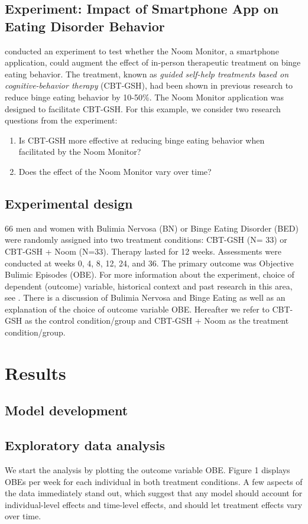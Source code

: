 \documentclass{article}
\begin{document}
\subsection{Experiment: Impact of Smartphone App on Eating Disorder Behavior}
 conducted an experiment to test whether the Noom Monitor, a smartphone application, could augment the effect of in-person therapeutic treatment on binge eating behavior.  The treatment, known as \emph{guided self-help treatments based on cognitive-behavior therapy} (CBT-GSH), had been shown in previous research to reduce binge eating behavior by 10-50\%.  The Noom Monitor application was designed to facilitate CBT-GSH.  For this example, we consider two research questions from the experiment:
\begin{enumerate}
\item{Is CBT-GSH more effective at reducing binge eating behavior when facilitated by the Noom Monitor?}
\item{Does the effect of the Noom Monitor vary over time?}
\end{enumerate}

\subsection*{Experimental design}
66 men and women with Bulimia Nervosa (BN) or Binge Eating Disorder (BED) were randomly assigned into two treatment conditions: CBT-GSH (N= 33) or CBT-GSH + Noom (N=33).  Therapy lasted for 12 weeks.  Assessments were conducted at weeks 0, 4, 8, 12, 24, and 36.  The primary outcome was Objective Bulimic Episodes (OBE).  For more information about the experiment, choice of dependent (outcome) variable, historical context and past research in this area, see . There is a discussion of Bulimia Nervosa and Binge Eating as well as an explanation of the choice of outcome variable OBE. Hereafter we refer to CBT-GSH as the control condition/group and CBT-GSH + Noom as the treatment condition/group.

\section{Results}
\subsection{Model development}
\subsection*{Exploratory data analysis}
We start the analysis by plotting the outcome variable OBE. Figure 1 displays OBEs per week for each individual in both treatment conditions.  A few aspects of the data immediately stand out, which suggest that any model should account for individual-level effects and time-level effects, and should let treatment effects vary over time.  
\end{document}
